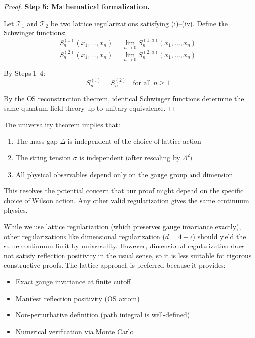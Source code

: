 \begin{proof}
\textbf{Step 5: Mathematical formalization.}

Let $\mathcal{T}_1$ and $\mathcal{T}_2$ be two lattice regularizations satisfying 
(i)--(iv). Define the Schwinger functions:
\[
S_n^{(1)}(x_1, \ldots, x_n) = \lim_{a \to 0} S_n^{(1,a)}(x_1, \ldots, x_n)
\]
\[
S_n^{(2)}(x_1, \ldots, x_n) = \lim_{a \to 0} S_n^{(2,a)}(x_1, \ldots, x_n)
\]

By Steps 1--4:
\[
S_n^{(1)} = S_n^{(2)} \quad \text{for all } n \geq 1
\]

By the OS reconstruction theorem, identical Schwinger functions determine 
the same quantum field theory up to unitary equivalence.
\end{proof}

\begin{remark}
The universality theorem implies that:
\begin{enumerate}[label=(\alph*)]
\item The mass gap $\Delta$ is independent of the choice of lattice action
\item The string tension $\sigma$ is independent (after rescaling by $\Lambda^2$)
\item All physical observables depend only on the gauge group and dimension
\end{enumerate}

This resolves the potential concern that our proof might depend on the 
specific choice of Wilson action. Any other valid regularization gives the 
same continuum physics.
\end{remark}

\begin{remark}
While we use lattice regularization (which preserves gauge invariance exactly), 
other regularizations like dimensional regularization ($d = 4 - \epsilon$) 
should yield the same continuum limit by universality. However, dimensional 
regularization does not satisfy reflection positivity in the usual sense, 
so it is less suitable for rigorous constructive proofs. The lattice approach 
is preferred because it provides:
\begin{itemize}
\item Exact gauge invariance at finite cutoff
\item Manifest reflection positivity (OS axiom)
\item Non-perturbative definition (path integral is well-defined)
\item Numerical verification via Monte Carlo
\end{itemize}
\end{remark}






